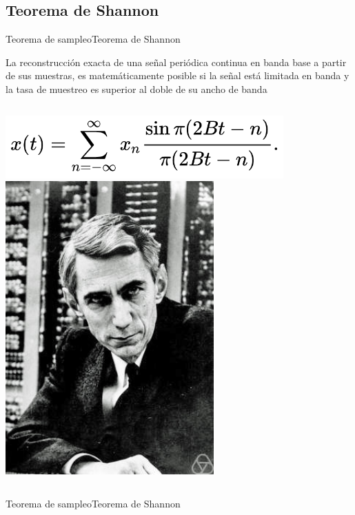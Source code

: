 \begin{darkframes}
      \subsection{Teorema de Shannon}
      \begin{frame}{Teorema de sampleo}{Teorema de Shannon}
         \begin{teorema}
          La reconstrucción exacta de una señal periódica continua en banda base a partir de sus muestras, es matemáticamente posible si la señal está limitada en banda y la tasa de muestreo es superior al doble de su ancho de banda
         \end{teorema}
         \begin{columns}[onlytextwidth]
            \center\includegraphics[width=0.8\textwidth]{1_clase/shannon}
            \center\includegraphics[width=0.6\textwidth]{1_clase/claude_shannon}
         \end{columns}
         \vfill
      \end{frame}
      \begin{frame}{Teorema de sampleo}{Teorema de Shannon}

\end{frame}
\end{darkframes}
